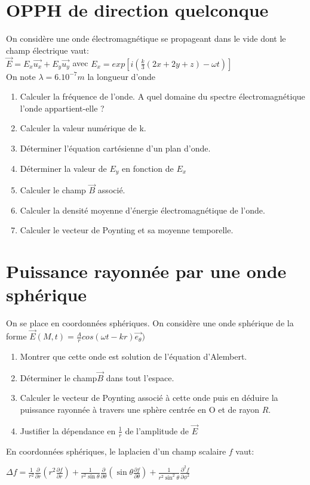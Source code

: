 \documentclass{article}
\begin{document}
\section{OPPH de direction quelconque}
On considère une onde électromagnétique se propageant dans le vide dont le champ électrique vaut:\\[0.2cm]
$\vec{E}=E_x\vec{u_x}+E_y\vec{u_y}$ avec $E_x=exp[i(\frac{k}{3}(2x+2y+z)-\omega t)]$\\[0.2cm]
On note $\lambda=6.10^{-7}m $ la longueur d'onde
\begin {enumerate}
\item Calculer la fréquence de l'onde. A quel domaine du spectre électromagnétique l'onde appartient-elle ? 
\item Calculer la valeur numérique de k.
\item Déterminer l'équation cartésienne d'un plan d'onde. 
\item Déterminer la valeur de $E_y$ en fonction de $E_x$
\item Calculer le champ $\vec{B}$ associé. 
\item Calculer la densité moyenne d'énergie électromagnétique de l'onde. 
\item Calculer le vecteur de Poynting et sa moyenne temporelle.
\end{enumerate}

\section{Puissance rayonnée par une onde sphérique}
On se place en coordonnées sphériques. 
On considère une onde sphérique de la forme $\vec{E}(M,t)=\frac{A}{r} cos(\omega t - k r ) \vec{e_\theta})$

\begin{enumerate}
    \item Montrer que cette onde est solution de l'équation d'Alembert.
    \item Déterminer le champ$ \vec{B}$ dans tout l'espace.
    \item Calculer le vecteur de Poynting associé à cette onde puis en déduire la puissance rayonnée à travers une sphère centrée en O et de rayon $R$. 
    \item Justifier la dépendance en $\frac{1}{r}$ de l'amplitude de $\vec{E}$
    
\end{enumerate}

En coordonnées sphériques, le laplacien d'un champ scalaire $f$ vaut: \\[0.1cm]
\par $\Delta f = \frac{1}{r^2} \frac{\partial}{\partial r} \left(r^2 \frac{\partial f}{\partial r}\right) + \frac{1}{r^2 \sin \theta} \frac{\partial}{\partial \theta} \left(\sin \theta \frac{\partial f}{\partial \theta}\right) + \frac{1}{r^2 \sin^2 \theta} \frac{\partial^2 f}{\partial \phi^2}
$
\\[0.1cm]
\end{document}
